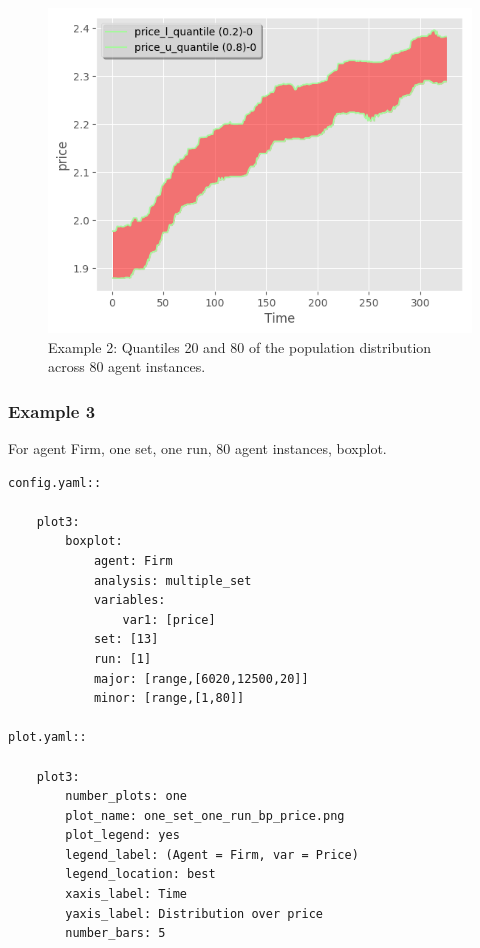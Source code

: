 \documentclass[10pt,a4paper]{article}
\begin{document}
\begin{figure}[b!]\centering\leavevmode
\includegraphics[scale=.6]{./plots_tut_2/one_set_multiple_runs_ts_quantile_0.png}
\caption{\footnotesize  Example 2: Quantiles 20 and 80 of the population distribution across 80 agent instances.}
\end{figure}

\clearpage
\subsubsection{Example 3}
 For agent Firm, one set, one run, 80 agent instances, boxplot.

\begin{lstlisting}
config.yaml::

    plot3:
        boxplot:
            agent: Firm
            analysis: multiple_set
            variables:
                var1: [price]
            set: [13]
            run: [1]
            major: [range,[6020,12500,20]]
            minor: [range,[1,80]]

plot.yaml::

    plot3:
        number_plots: one
        plot_name: one_set_one_run_bp_price.png
        plot_legend: yes
        legend_label: (Agent = Firm, var = Price)
        legend_location: best
        xaxis_label: Time
        yaxis_label: Distribution over price
        number_bars: 5
\end{lstlisting}
\end{document}
